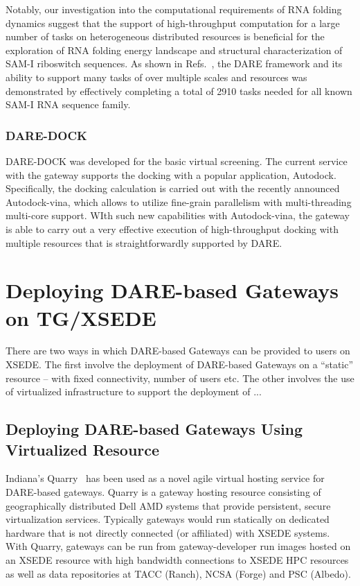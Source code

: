 \documentclass[]{svjour3}
\begin{document}
Notably, our investigation into the computational requirements of RNA
folding dynamics suggest that the support of high-throughput
computation for a large number of tasks on heterogeneous distributed
resources is beneficial for the exploration of RNA folding energy
landscape and structural characterization of SAM-I riboswitch
sequences. As shown in Refs.~\cite{dare-ecmls11,ccpe11}, the DARE
framework and its ability to support many tasks of over multiple
scales and resources was demonstrated by effectively completing a
total of 2910 tasks needed for all known SAM-I RNA sequence family.

\subsubsection{DARE-DOCK}
DARE-DOCK was developed for the basic virtual screening.  The current
service with the gateway supports the docking with a popular
application, Autodock\cite{autodock}. 
Specifically, the docking calculation is carried out with the recently
announced Autodock-vina, which allows to utilize fine-grain
parallelism with multi-threading multi-core support.  WIth such new
capabilities with Autodock-vina, the gateway is able to carry out a
very effective execution of high-throughput docking with multiple
resources that is straightforwardly supported by DARE.

%

\section{Deploying DARE-based Gateways on TG/XSEDE}

There are two ways in which DARE-based Gateways can be provided to
users on XSEDE. The first involve the deployment of DARE-based
Gateways on a ``static'' resource -- with fixed connectivity, number
of users etc. The other involves the use of virtualized infrastructure
to support the deployment of ...

\subsection{Deploying DARE-based Gateways Using Virtualized Resource}
Indiana's Quarry~\cite{quarry} has been used as a novel agile virtual hosting
service for DARE-based gateways. Quarry is a gateway hosting resource
consisting of
geographically distributed Dell AMD systems that provide persistent,
secure virtualization services. Typically gateways would run
statically on dedicated hardware that is not directly connected (or
affiliated) with XSEDE systems. With Quarry, gateways can be run from
gateway-developer run images hosted on an XSEDE resource with high
bandwidth connections to XSEDE HPC resources as well as data
repositories at TACC (Ranch), NCSA (Forge) and PSC (Albedo).
\end{document}
